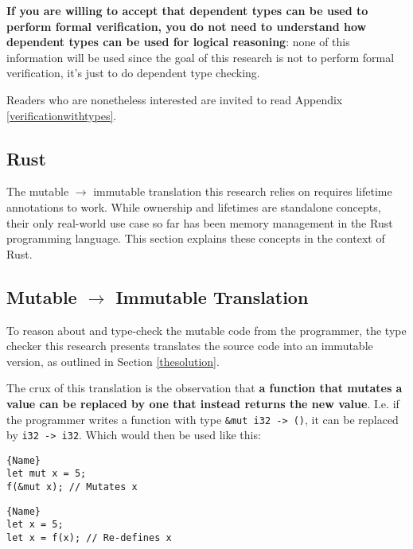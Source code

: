 \documentclass[12pt,twoside]{report}
\begin{document}
\textbf{If you are willing to accept that dependent types can be used to perform formal verification, you do not need to understand how dependent types can be used for logical reasoning}: none of this information will be used since the goal of this research is not to perform formal verification, it's just to do dependent type checking.

Readers who are nonetheless interested are invited to read Appendix \ref{verificationwithtypes}.

\subsection{Rust}
The mutable $\rightarrow$ immutable translation this research relies on requires lifetime annotations to work. While ownership and lifetimes are standalone concepts, their only real-world use case so far has been memory management in the Rust programming language. This section explains these concepts in the context of Rust.


\subsection{Mutable $\rightarrow$ Immutable Translation}
To reason about and type-check the mutable code from the programmer, the type checker this research presents translates the source code into an immutable version, as outlined in Section \ref{thesolution}.

The crux of this translation is the observation that \textbf{a function that mutates a value can be replaced by one that instead returns the new value}. I.e. if the programmer writes a function with type \verb|&mut i32 -> ()|, it can be replaced by \verb|i32 -> i32|. Which would then be used like this:

\noindent\begin{minipage}{.45\textwidth}
\begin{lstlisting}[caption=Original]{Name}
let mut x = 5;
f(&mut x); // Mutates x
\end{lstlisting}
\end{minipage}\hfill
\begin{minipage}{.45\textwidth}
\begin{lstlisting}[caption=Translated]{Name}
let x = 5;
let x = f(x); // Re-defines x
\end{lstlisting}
\end{minipage}
\end{document}

